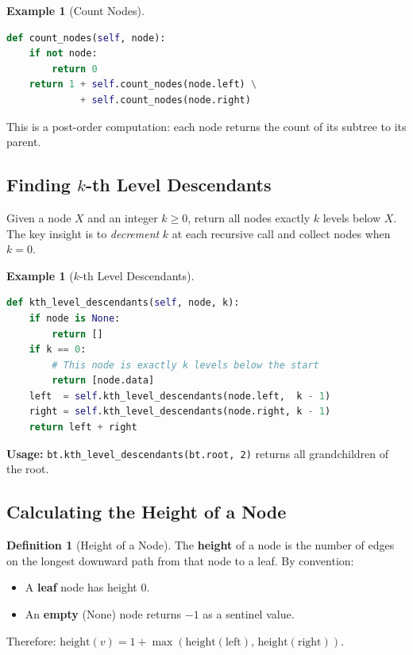 \documentclass[11pt, a4paper, notitlepage]{report}
\theoremstyle{definition}
\newtheorem{definition}[theorem]{Definition}
\theoremstyle{remark}
\theoremstyle{definition}
\newtheorem{example}[theorem]{Example}
\begin{document}
\begin{example}[Count Nodes]
\label{ex:count-nodes}
\leavevmode
\begin{lstlisting}[language=Python]
def count_nodes(self, node):
    if not node:
        return 0
    return 1 + self.count_nodes(node.left) \
             + self.count_nodes(node.right)
\end{lstlisting}
\end{example}

This is a post-order computation: each node returns the count of its subtree
to its parent.

\subsection{Finding $k$-th Level Descendants}
\label{subsec:kth-level}

Given a node $X$ and an integer $k \geq 0$, return all nodes exactly $k$
levels below $X$.  The key insight is to \emph{decrement} $k$ at each
recursive call and collect nodes when $k = 0$.

\begin{example}[$k$-th Level Descendants]
\label{ex:kth-level}
\leavevmode
\begin{lstlisting}[language=Python]
def kth_level_descendants(self, node, k):
    if node is None:
        return []
    if k == 0:
        # This node is exactly k levels below the start
        return [node.data]
    left  = self.kth_level_descendants(node.left,  k - 1)
    right = self.kth_level_descendants(node.right, k - 1)
    return left + right
\end{lstlisting}

\textbf{Usage:} \texttt{bt.kth\_level\_descendants(bt.root, 2)} returns all
grandchildren of the root.
\end{example}

\subsection{Calculating the Height of a Node}
\label{subsec:height}

\begin{definition}[Height of a Node]
\label{def:height-node}
The \textbf{height} of a node is the number of edges on the longest downward
path from that node to a leaf.  By convention:
\begin{itemize}
  \item A \textbf{leaf} node has height $0$.
  \item An \textbf{empty} (None) node returns $-1$ as a sentinel value.
\end{itemize}
Therefore: $\text{height}(v) = 1 + \max(\text{height}(\text{left}),\,
\text{height}(\text{right}))$.
\end{definition}
\end{document}
